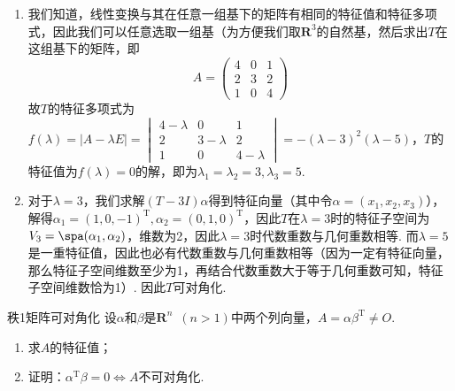 \begin{solution}
    \begin{enumerate}
        \item 我们知道，线性变换与其在任意一组基下的矩阵有相同的特征值和特征多项式，因此我们可以任意选取一组基（为方便我们取$\mathbf{R}^3$的自然基，然后求出$T$在这组基下的矩阵，即
              \[A=\begin{pmatrix}
                      4 & 0 & 1 \\
                      2 & 3 & 2 \\
                      1 & 0 & 4
                  \end{pmatrix}\]
              故$T$的特征多项式为$f(\lambda)=|A-\lambda E|=\begin{vmatrix}
                      4-\lambda & 0         & 1         \\
                      2         & 3-\lambda & 2         \\
                      1         & 0         & 4-\lambda
                  \end{vmatrix}=-(\lambda-3)^2(\lambda-5)$，$T$的特征值为$f(\lambda)=0$的解，即为$\lambda_1=\lambda_2=3,\lambda_3=5$.

        \item 对于$\lambda=3$，我们求解$(T-3I)\alpha$得到特征向量（其中令$\alpha=(x_1,x_2,x_3)$），解得$\alpha_1=(1,0,-1)^\mathrm{T},\alpha_2=(0,1,0)^\mathrm{T}$，因此$T$在$\lambda=3$时的特征子空间为$V_3=\spa(\alpha_1,\alpha_2)$，维数为2，因此$\lambda=3$时代数重数与几何重数相等. 而$\lambda=5$是一重特征值，因此也必有代数重数与几何重数相等（因为一定有特征向量，那么特征子空间维数至少为1，再结合代数重数大于等于几何重数可知，特征子空间维数恰为1）. 因此$T$可对角化.
    \end{enumerate}
\end{solution}

\begin{example}{}{秩1矩阵可对角化}
    设$\alpha$和$\beta$是$\mathbf{R}^n\enspace (n>1)$中两个列向量，$A=\alpha\beta^\mathrm{T}\neq O$.
    \begin{enumerate}
        \item 求$A$的特征值；

        \item 证明：$\alpha^\mathrm{T}\beta=0\iff A$不可对角化.
    \end{enumerate}
\end{example}

